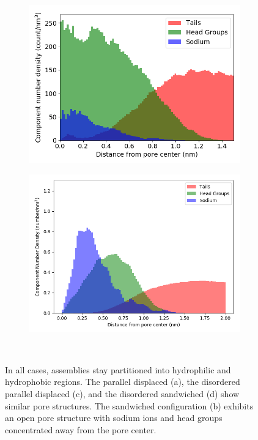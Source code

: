 \documentclass{article}
\begin{document}
\begin{figure}
\begin{subfigure}{0.45\textwidth}
        \includegraphics[width=1\linewidth]{disordered_offset_density.png}
        \caption{}
        \label{fig:disordered_offset_density}
  \end{subfigure}
  \begin{subfigure}{0.45\textwidth}
        \includegraphics[width=1\linewidth]{disordered_density.png}
        \caption{}
        \label{fig:disorder_layered_density}
  \end{subfigure}
  \caption{In all cases, assemblies stay partitioned into hydrophilic and
	  hydrophobic regions. The parallel displaced (a), the disordered parallel
	  displaced (c), and the disordered sandwiched (d) show similar pore structures.
	  The sandwiched configuration (b) exhibits an open pore structure with sodium
	  ions and head groups concentrated away from the pore
	  center.}~\label{fig:densities}
  \end{figure}
\end{document}
